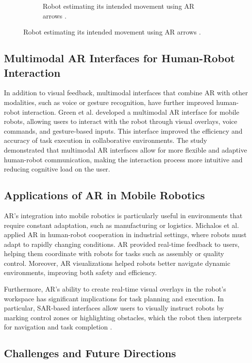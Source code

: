 \begin{figure}[ht]
\begin{subfigure}[b]{0.32\textwidth}
        \caption{Robot estimating its intended movement using AR arrows \cite{Coovert2014}.}
        \label{fig:intended_path}
    \end{subfigure}
\end{figure}



\subsection{Multimodal AR Interfaces for Human-Robot Interaction}

In addition to visual feedback, multimodal interfaces that combine AR with other modalities, such as voice or gesture recognition, have further improved human-robot interaction. Green et al. \cite{Green2019} developed a multimodal AR interface for mobile robots, allowing users to interact with the robot through visual overlays, voice commands, and gesture-based inputs. This interface improved the efficiency and accuracy of task execution in collaborative environments. The study demonstrated that multimodal AR interfaces allow for more flexible and adaptive human-robot communication, making the interaction process more intuitive and reducing cognitive load on the user.

\subsection{Applications of AR in Mobile Robotics}

AR’s integration into mobile robotics is particularly useful in environments that require constant adaptation, such as manufacturing or logistics. Michalos et al. \cite{Michalos2022} applied AR in human-robot cooperation in industrial settings, where robots must adapt to rapidly changing conditions. AR provided real-time feedback to users, helping them coordinate with robots for tasks such as assembly or quality control. Moreover, AR visualizations helped robots better navigate dynamic environments, improving both safety and efficiency.

Furthermore, AR’s ability to create real-time visual overlays in the robot’s workspace has significant implications for task planning and execution. In particular, SAR-based interfaces allow users to visually instruct robots by marking control zones or highlighting obstacles, which the robot then interprets for navigation and task completion \cite{Coovert2014}.

\subsection{Challenges and Future Directions}

